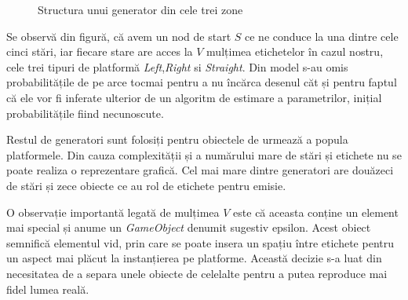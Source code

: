\vspace{10mm}
\begin{figure}[H]
\centering
{}
\caption{Structura unui generator din cele trei zone}
\end{figure}
\par

Se observă din figură, că avem un nod de start $S$ ce ne conduce la una dintre cele cinci stări, iar fiecare stare are acces la $V$ mulțimea etichetelor în cazul nostru, cele trei tipuri de platformă \textit{Left},\textit{Right} si \textit{Straight}. Din model s-au omis probabilitățile de pe arce tocmai pentru a nu încărca desenul căt și pentru faptul că ele vor fi inferate ulterior de un algoritm de estimare a parametrilor, inițial probabilitățile fiind necunoscute.\par

Restul de generatori sunt folosiți pentru obiectele de urmează a popula platformele. Din cauza complexității și a numărului mare de stări și etichete nu se poate realiza o reprezentare grafică. Cel mai mare dintre generatori are douăzeci de stări și zece obiecte ce au rol de etichete pentru emisie.\par

O observație importantă legată de mulțimea $V$ este că aceasta conține un element mai special și anume un \textit{GameObject} denumit sugestiv epsilon. Acest obiect semnifică elementul vid, prin care se poate insera un spațiu între etichete pentru un aspect mai plăcut la instanțierea pe platforme. Această decizie s-a luat din necesitatea de a separa unele obiecte de celelalte pentru a putea reproduce mai fidel lumea reală.\par


